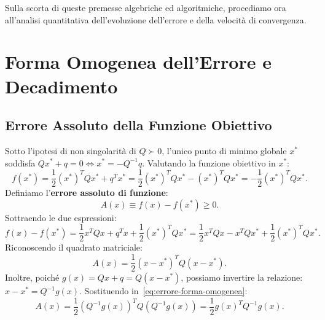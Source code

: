 Sulla scorta di queste premesse algebriche ed algoritmiche, procediamo ora all'analisi quantitativa dell'evoluzione dell'errore e della velocit\`a di convergenza.

\FloatBarrier
\section{Forma Omogenea dell'Errore e Decadimento}
\label{sec:forma-omogenea-errore}

\subsection{Errore Assoluto della Funzione Obiettivo}
Sotto l'ipotesi di non singolarit\`a di $Q \succ 0$, l'unico punto di minimo globale $x^*$ soddisfa $Q x^* + q = 0 \iff x^* = -Q^{-1}q$. Valutando la funzione obiettivo in $x^*$:
\begin{equation}
    f(x^*) = \frac{1}{2} (x^*)^T Q x^* + q^T x^* = \frac{1}{2} (x^*)^T Q x^* - (x^*)^T Q x^* = -\frac{1}{2} (x^*)^T Q x^*.
\end{equation}
Definiamo l'\textbf{errore assoluto di funzione}:
\begin{equation}
    A(x) \equiv f(x) - f(x^*) \ge 0.
\end{equation}
Sottraendo le due espressioni:
\begin{equation}
    f(x) - f(x^*) = \frac{1}{2} x^T Q x + q^T x + \frac{1}{2} (x^*)^T Q x^* = \frac{1}{2} x^T Q x - x^T Q x^* + \frac{1}{2} (x^*)^T Q x^*.
\end{equation}
Riconoscendo il quadrato matriciale:
\begin{equation}
    A(x) = \frac{1}{2} (x - x^*)^T Q (x - x^*).
    \label{eq:errore-forma-omogenea}
\end{equation}
Inoltre, poich\'e $g(x) = Q x + q = Q(x - x^*)$, possiamo invertire la relazione: $x - x^* = Q^{-1} g(x)$. Sostituendo in~\eqref{eq:errore-forma-omogenea}:
\begin{equation}
    A(x) = \frac{1}{2} (Q^{-1} g(x))^T Q (Q^{-1} g(x)) = \frac{1}{2} g(x)^T Q^{-1} g(x).
    \label{eq:errore-gradiente-inversa}
\end{equation}

